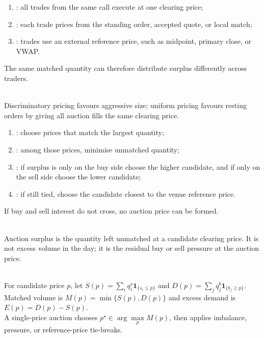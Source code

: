 \begin{taxonomy} 
\begin{enumerate}[label=\roman*.]
\setlength{\itemsep}{0pt}
\item {}: all trades from the same call execute at one clearing price;
\item {}: each trade prices from the standing order, accepted quote, or local match;
\item {}: trades use an external reference price, such as midpoint, primary close, or VWAP.
\end{enumerate}
The same matched quantity can therefore distribute surplus differently across traders.
\end{taxonomy}

\begin{principle} \\
Discriminatory pricing favours aggressive size; uniform pricing favours resting orders by giving all auction fills the same clearing price.
\end{principle}

\begin{process} 
\begin{enumerate}[label=\roman*.]
\setlength{\itemsep}{0pt}
\item {}: choose prices that match the largest quantity;
\item {}: among those prices, minimise unmatched quantity;
\item {}: if surplus is only on the buy side choose the higher candidate, and if only on the sell side choose the lower candidate;
\item {}: if still tied, choose the candidate closest to the venue reference price.
\end{enumerate}
If buy and sell interest do not cross, no auction price can be formed.
\end{process}

\begin{definition} \\
Auction surplus is the quantity left unmatched at a candidate clearing price. It is not excess volume in the day; it is the residual buy or sell pressure at the auction price.
\end{definition}

\begin{model} \\
For candidate price $p$, let $S(p)=\sum\limits_i q_i^s\mathbf{1}_{\{s_i\leq p\}}$ and $D(p)=\sum\limits_j q_j^b\mathbf{1}_{\{b_j\geq p\}}$.\\
Matched volume is $M(p)=\min\{S(p),D(p)\}$ and excess demand is $E(p)=D(p)-S(p)$.\\
A single-price auction chooses $p^\star\in\arg\max\limits_{p} M(p)$, then applies imbalance, pressure, or reference-price tie-breaks.
\end{model}

